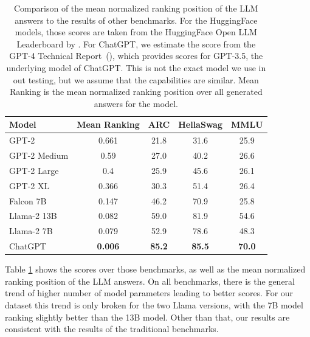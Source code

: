 \begin{table}[tb]
    \centering
    \begin{tabularx}{\textwidth}{lcccc}
    \hline
    \textbf{Model} & \textbf{Mean Ranking} & \textbf{ARC}  & \textbf{HellaSwag} & \textbf{MMLU} \\\hline
    GPT-2          & 0.661                             & 21.8          & 31.6               & 25.9          \\
    GPT-2 Medium   & 0.59                              & 27.0          & 40.2               & 26.6          \\
    GPT-2 Large    & 0.4                               & 25.9          & 45.6               & 26.1          \\
    GPT-2 XL       & 0.366                             & 30.3          & 51.4               & 26.4          \\
    Falcon 7B      & 0.147                             & 46.2          & 70.9               & 25.8          \\
    Llama-2 13B    & 0.082                             & 59.0          & 81.9               & 54.6          \\
    Llama-2 7B     & 0.079                             & 52.9          & 78.6               & 48.3          \\
    ChatGPT        & \textbf{0.006}                    & \textbf{85.2} & \textbf{85.5}      & \textbf{70.0} \\
    \hline
    \end{tabularx}
    \caption{Comparison of the mean normalized ranking position of the LLM answers to the results of other benchmarks.
    For the HuggingFace models, those scores are taken from the HuggingFace Open LLM Leaderboard by \cite{beeching:2023:Open}.
    For ChatGPT, we estimate the score from the GPT-4 Technical Report~(\cite{openai:2023:GPT}), which provides scores for GPT-3.5, the underlying model of ChatGPT.
    This is not the exact model we use in out testing, but we assume that the capabilities are similar.
    Mean Ranking is the mean normalized ranking position over all generated answers for the model.
    }
    \label{tab:benchmark_comparison}
\end{table}
Table \ref{tab:benchmark_comparison} shows the scores over those benchmarks, as well as the mean normalized ranking position of the LLM answers.
On all benchmarks, there is the general trend of higher number of model parameters leading to better scores.
For our dataset this trend is only broken for the two Llama versions, with the 7B model ranking slightly better than the 13B model.
Other than that, our results are consistent with the results of the traditional benchmarks.
